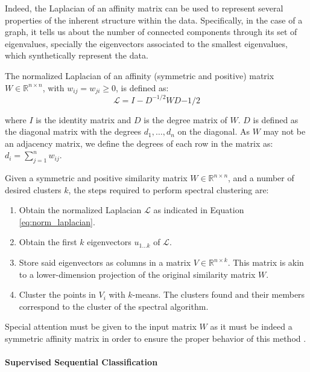 Indeed, the Laplacian of an affinity matrix can be used to represent several properties of the inherent structure within the data. Specifically, in the case of a graph, it tells us about the number of connected components through its  set of eigenvalues, specially the eigenvectors associated to the smallest eigenvalues, which synthetically represent the data.

The normalized Laplacian of an affinity (symmetric and positive) matrix $W\in \mathbb{R}^{n\times n}$, with $w_{ij} = w_{ji} \geq 0$, is defined as: 
\begin{equation}\label{eq:norm_laplacian}
\mathcal{L} = I - D^{-1/2}WD{-1/2}
\end{equation}

where $I$ is the identity matrix and $D$ is the degree matrix of $W$. $D$ is defined as the diagonal matrix with the degrees $d_1 ,\dots,d_n$ on the diagonal. As $W$ may not be an adjacency matrix, we define the degrees of each row in the matrix as: $d_i=\sum_{j=1}^{n}{w_{ij}}$.

Given a  symmetric and positive similarity matrix $W \in \mathbb{R}^{n \times n}$, and a number of desired clusters $k$, the steps required to perform spectral clustering are:

\begin{enumerate}
\item Obtain the normalized Laplacian $\mathcal{L}$ as indicated in Equation \ref{eq:norm_laplacian}.
\item Obtain the first $k$ eigenvectors $u_{1\dots k}$ of $\mathcal{L}$.
\item Store said eigenvectors as columns in a matrix $V \in \mathbb{R}^{n \times k}$. This matrix is akin to a lower-dimension projection of the original similarity matrix $W$.
\item Cluster the points in $V_i$ with $k$-means. The clusters found and their members correspond to the cluster of the spectral algorithm.
\end{enumerate}

Special attention must be given to the input matrix $W$ as it must be indeed a symmetric affinity matrix in order to ensure the proper behavior of this method \cite{Luxburg2007,GoyalH14}.



\paragraph{Supervised Sequential Classification}\label{sec:perceptron}

